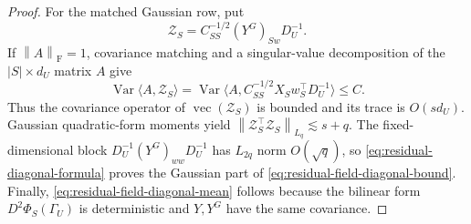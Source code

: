 \documentclass[a4paper,11pt,english]{article}
\newcommand{\Var}{\operatorname{Var}}
\newcommand{\norm}[1]{\left\lVert #1\right\rVert}
\begin{document}
\begin{proof}
For the matched Gaussian row, put
\[
 \mathcal Z_S=C_{SS}^{-1/2}(Y^G)_{Sw}D_U^{-1}.
\]
If $\norm A_{\mathrm F}=1$, covariance matching and a singular-value
decomposition of the $|S|\times d_U$ matrix $A$ give
\[
 \Var\langle A,\mathcal Z_S\rangle
 =\Var\langle A,C_{SS}^{-1/2}X_Sw_S^\top D_U^{-1}\rangle
 \le C.
\]
Thus the covariance operator of $\operatorname{vec}(\mathcal Z_S)$ is
bounded and its trace is $O(sd_U)$.  Gaussian quadratic-form moments yield
$\norm{\mathcal Z_S^\top\mathcal Z_S}_{L_q}\lesssim s+q$.
The fixed-dimensional block
$D_U^{-1}(Y^G)_{ww}D_U^{-1}$ has $L_{2q}$ norm $O(\sqrt q)$, so
\eqref{eq:residual-diagonal-formula} proves the Gaussian part of
\eqref{eq:residual-field-diagonal-bound}.  Finally,
\eqref{eq:residual-field-diagonal-mean} follows because the bilinear form
$D^2\Phi_S(\Gamma_U)$ is deterministic and $Y,Y^G$ have the same
covariance.
\end{proof}
\end{document}
